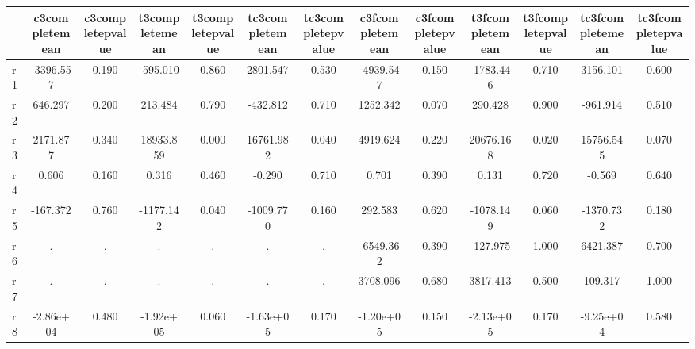 \begin{table}[htbp]
\begin{tabular}{lcccccccccccc} \hline \hline
 & c3completemean  & c3completepvalue  & t3completemean  & t3completepvalue  & tc3completemean  & tc3completepvalue  & c3fcompletemean  & c3fcompletepvalue  & t3fcompletemean  & t3fcompletepvalue  & tc3fcompletemean  & tc3fcompletepvalue  \\  \hline 
r1 & -3396.557 &     0.190 &  -595.010 &     0.860 &  2801.547 &     0.530 & -4939.547 &     0.150 & -1783.446 &     0.710 &  3156.101 &     0.600 \\  
r2 &   646.297 &     0.200 &   213.484 &     0.790 &  -432.812 &     0.710 &  1252.342 &     0.070 &   290.428 &     0.900 &  -961.914 &     0.510 \\  
r3 &  2171.877 &     0.340 & 18933.859 &     0.000 & 16761.982 &     0.040 &  4919.624 &     0.220 & 20676.168 &     0.020 & 15756.545 &     0.070 \\  
r4 &     0.606 &     0.160 &     0.316 &     0.460 &    -0.290 &     0.710 &     0.701 &     0.390 &     0.131 &     0.720 &    -0.569 &     0.640 \\  
r5 &  -167.372 &     0.760 & -1177.142 &     0.040 & -1009.770 &     0.160 &   292.583 &     0.620 & -1078.149 &     0.060 & -1370.732 &     0.180 \\  
r6 &         . &         . &         . &         . &         . &         . & -6549.362 &     0.390 &  -127.975 &     1.000 &  6421.387 &     0.700 \\  
r7 &         . &         . &         . &         . &         . &         . &  3708.096 &     0.680 &  3817.413 &     0.500 &   109.317 &     1.000 \\  
r8 & -2.86e+04 &     0.480 & -1.92e+05 &     0.060 & -1.63e+05 &     0.170 & -1.20e+05 &     0.150 & -2.13e+05 &     0.170 & -9.25e+04 &     0.580 \\  
\hline \hline \end{tabular}
\end{table}

